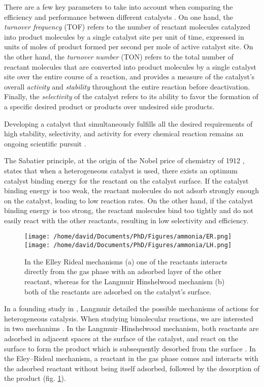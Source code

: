 There are a few key parameters to take into account when comparing the efficiency and performance between different catalysts \parencite{Boudart1995, ZHANG2019, WACHS2022}.
On one hand, the \textit{turnover frequency} (TOF) refers to the number of reactant molecules catalyzed into product molecules by a single catalyst site per unit of time, expressed in units of moles of product formed per second per mole of active catalyst site.
On the other hand, the \textit{turnover number} (TON) refers to the total number of reactant molecules that are converted into product molecules by a single catalyst site over the entire course of a reaction, and provides a measure of the catalyst's overall \textit{activity} and \textit{stability} throughout the entire reaction before deactivation.
Finally, the \textit{selectivity} of the catalyst refers to its ability to favor the formation of a specific desired product or products over undesired side products.

Developing a catalyst that simultaneously fulfills all the desired requirements of high stability, selectivity, and activity for every chemical reaction remains an ongoing scientific pursuit \parencite{Hagen2016}.

The Sabatier principle, at the origin of the Nobel price of chemistry of 1912 \parencite{Che2013}, states that when a heterogeneous catalyst is used, there exists an optimum catalyst binding energy for the reactant on the catalyst surface.
If the catalyst binding energy is too weak, the reactant molecules do not adsorb strongly enough on the catalyst, leading to low reaction rates.
On the other hand, if the catalyst binding energy is too strong, the reactant molecules bind too tightly and do not easily react with the other reactants, resulting in low selectivity and efficiency.

\begin{figure}[!htb]
    \centering
    \texttt{[image: /home/david/Documents/PhD/Figures/ammonia/ER.png]}
    \texttt{[image: /home/david/Documents/PhD/Figures/ammonia/LH.png]}
    \caption{
        In the Elley Rideal mechanisms (a) one of the reactants interacts directly from the gas phase with an adsorbed layer of the other reactant, whereas for the Langmuir Hinshelwood mechanism (b) both of the reactants are adsorbed on the catalyst's surface.
    }
    \label{fig:Mechanisms}
\end{figure}

In a founding study in \cite*{Langmuir1922}, Langmuir detailed the possible mechanisms of actions for heterogeneous catalysis.
When studying bimolecular reactions, we are interested in two mechanims \parencite{catal12101134}.
In the Langmuir–Hinshelwood mechanism, both reactants are adsorbed in adjacent spaces at the surface of the catalyst, and react on the surface to form the product which is subsequently desorbed from the surface \parencite{Prins2018, ROSS2019}.
In the Eley–Rideal mechanism, a reactant in the gas phase comes and interacts with the adsorbed reactant without being itself adsorbed, followed by the desorption of the product \parencite{rideal_1939, Weinberg1996}  (fig. \ref{fig:Mechanisms}).

